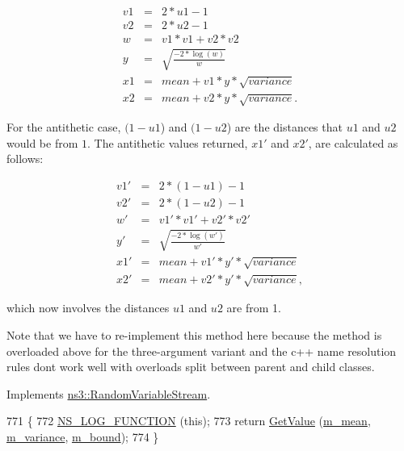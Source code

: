 \begin{eqnarray*} v1 & = & 2 * u1 - 1 \\ v2 & = & 2 * u2 - 1 \\ w & = & v1 * v1 + v2 * v2 \\ y & = & \sqrt{\frac{-2 * \log(w)}{w}} \\ x1 & = & mean + v1 * y * \sqrt{variance} \\ x2 & = & mean + v2 * y * \sqrt{variance} . \end{eqnarray*}

For the antithetic case, $(1 - u1$) and $(1 - u2$) are the distances that $u1$ and $u2$ would be from $1$. The antithetic values returned, $x1'$ and $x2'$, are calculated as follows\+:

\begin{eqnarray*} v1' & = & 2 * (1 - u1) - 1 \\ v2' & = & 2 * (1 - u2) - 1 \\ w' & = & v1' * v1' + v2' * v2' \\ y' & = & \sqrt{\frac{-2 * \log(w')}{w'}} \\ x1' & = & mean + v1' * y' * \sqrt{variance} \\ x2' & = & mean + v2' * y' * \sqrt{variance} , \end{eqnarray*}

which now involves the distances $u1$ and $u2$ are from 1.

Note that we have to re-\/implement this method here because the method is overloaded above for the three-\/argument variant and the c++ name resolution rules don\textquotesingle{}t work well with overloads split between parent and child classes. 

Implements \hyperlink{classns3_1_1RandomVariableStream_a4fa5944dc4cb11544e661ed23072b36c}{ns3\+::\+Random\+Variable\+Stream}.


\begin{DoxyCode}
771 \{
772   \hyperlink{log-macros-disabled_8h_a90b90d5bad1f39cb1b64923ea94c0761}{NS\_LOG\_FUNCTION} (\textcolor{keyword}{this});
773   \textcolor{keywordflow}{return} \hyperlink{classns3_1_1NormalRandomVariable_ab2a04ca1bd9177ecdc7530e525c216e3}{GetValue} (\hyperlink{classns3_1_1NormalRandomVariable_a6a4930dc7c730451277d9889f5b1a0d9}{m\_mean}, \hyperlink{classns3_1_1NormalRandomVariable_aa61551cf5da3b7e76d6df6295129e399}{m\_variance}, \hyperlink{classns3_1_1NormalRandomVariable_ad173b135405ef0f2b7a2a94f7befe9fd}{m\_bound});
774 \}
\end{DoxyCode}


